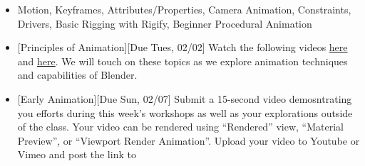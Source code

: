 \def\dMon{Mon, 02/01}
\def\dTues{Tues, 02/02}
\def\dWed{Wed, 02/03}
\def\dThur{Thur, 02/04}
\def\dFri{Fri, 02/05}
\def\dSat{Sat, 02/06}
\def\dSun{Sun, 02/07}
\placeDate


\begin{itemize}[noitemsep,topsep=0pt,leftmargin=*]
    \item {} Motion, Keyframes, Attributes/Properties, Camera Animation, Constraints, Drivers, Basic Rigging with Rigify, Beginner Procedural Animation
    \item {}[Principles of Animation][Due \dTues] Watch the following videos \href{https://www.youtube.com/watch?v=uDqjIdI4bF4}{here} and \href{https://www.youtube.com/watch?v=wtJeoPAGbfY}{here}. We will touch on these topics as we explore animation techniques and capabilities of Blender.
    \item {}[Early Animation][Due \dSun] Submit a 15-second video demosntrating you efforts during this week's workshops as well as your explorations outside of the class. Your video can be rendered using ``Rendered'' view, ``Material Preview'', or ``Viewport Render Animation''. Upload your video to Youtube or Vimeo and post the link to \discordE
\end{itemize}